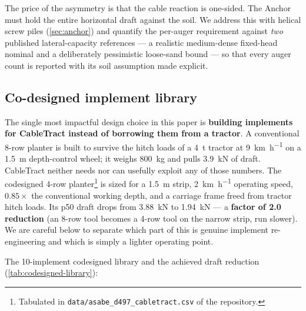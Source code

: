 \documentclass[11pt,a4paper]{article}
\begin{document}
The price of the asymmetry is that the cable reaction is one-sided. The Anchor must hold the entire horizontal draft against the soil. We address this with helical screw piles (\cref{sec:anchor}) and quantify the per-auger requirement against \emph{two} published lateral-capacity references --- a realistic medium-dense fixed-head nominal and a deliberately pessimistic loose-sand bound --- so that every auger count is reported with its soil assumption made explicit.

\subsection{Co-designed implement library}\label{sec:codesign}

The single most impactful design choice in this paper is \textbf{building implements for CableTract instead of borrowing them from a tractor}. A conventional 8-row planter is built to survive the hitch loads of a \SI{4}{\tonne} tractor at \SI{9}{\kilo\meter\per\hour} on a \SI{1.5}{\meter} depth-control wheel; it weighs \SI{800}{\kilogram} and pulls \SI{3.9}{\kilo\newton} of draft. CableTract neither needs nor can usefully exploit any of those numbers. The codesigned 4-row planter\footnote{Tabulated in \texttt{data/asabe\_d497\_cabletract.csv} of the repository.} is sized for a \SI{1.5}{\meter} strip, \SI{2}{\kilo\meter\per\hour} operating speed, $0.85\times$ the conventional working depth, and a carriage frame freed from tractor hitch loads. Its \gls{p50} draft drops from \SI{3.88}{\kilo\newton} to \SI{1.94}{\kilo\newton} --- a \textbf{factor of 2.0 reduction} (an 8-row tool becomes a 4-row tool on the narrow strip, run slower). We are careful below to separate which part of this is genuine implement re-engineering and which is simply a lighter operating point.

The 10-implement codesigned library and the achieved draft reduction (\cref{tab:codesigned-library}):
\end{document}
